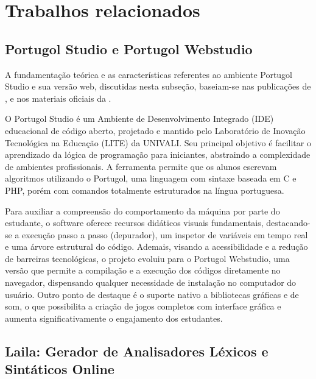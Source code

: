 \label{sec:softwares-apoio}
 


\section{Trabalhos relacionados}

\subsection{Portugol Studio e Portugol Webstudio}

A fundamentação teórica e as características referentes ao ambiente Portugol Studio e sua versão web, discutidas nesta subseção, baseiam-se nas publicações de ,  e nos materiais oficiais da .

O Portugol Studio é um Ambiente de Desenvolvimento Integrado (IDE) educacional de código aberto, projetado e mantido pelo Laboratório de Inovação Tecnológica na Educação (LITE) da UNIVALI. Seu principal objetivo é facilitar o aprendizado da lógica de programação para iniciantes, abstraindo a complexidade de ambientes profissionais. A ferramenta permite que os alunos escrevam algoritmos utilizando o Portugol, uma linguagem com sintaxe baseada em C e PHP, porém com comandos totalmente estruturados na língua portuguesa.

Para auxiliar a compreensão do comportamento da máquina por parte do estudante, o software oferece recursos didáticos visuais fundamentais, destacando-se a execução passo a passo (depurador), um inspetor de variáveis em tempo real e uma árvore estrutural do código. Ademais, visando a acessibilidade e a redução de barreiras tecnológicas, o projeto evoluiu para o Portugol Webstudio, uma versão que permite a compilação e a execução dos códigos diretamente no navegador, dispensando qualquer necessidade de instalação no computador do usuário. Outro ponto de destaque é o suporte nativo a bibliotecas gráficas e de som, o que possibilita a criação de jogos completos com interface gráfica e aumenta significativamente o engajamento dos estudantes.



\subsection{Laila: Gerador de Analisadores Léxicos e Sintáticos Online}

